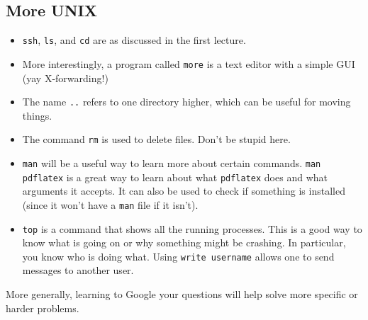 \subsection{More UNIX}
\begin{itemize}
\item \texttt{ssh}, \texttt{ls}, and \texttt{cd} are as discussed in the first lecture.
\item More interestingly, a program called \texttt{more} is a text editor with a simple GUI (yay X-forwarding!)
\item The name \texttt{..} refers to one directory higher, which can be useful for moving things.
\item The command \texttt{rm} is used to delete files. Don't be stupid here.
\item \texttt{man} will be a useful way to learn more about certain commands. \texttt{man pdflatex} is a great way to learn about what \texttt{pdflatex} does and what arguments it accepts. It can also be used to check if something is installed (since it won't have a \texttt{man} file if it isn't).
\item \texttt{top} is a command that shows all the running processes. This is a good way to know what is going on or why something might be crashing. In particular, you know who is doing what. Using \texttt{write username} allows one to send messages to another user.
\end{itemize}
More generally, learning to Google your questions will help solve more specific or harder problems.
